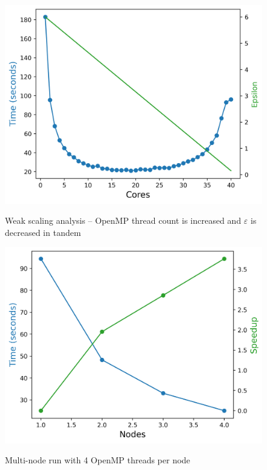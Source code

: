 \begin{figure}[h]
  \centering
  \begin{minipage}{0.45\linewidth}
  \includegraphics[width=\linewidth]{figs/omp_weak.out}
	\caption{Weak scaling analysis -- OpenMP thread count is increased and $\varepsilon$ is decreased in tandem}
    \label{fig:omp_weak}
  \end{minipage}
  \hspace{.05\linewidth}
 \begin{minipage}{0.45\linewidth}
  \includegraphics[width=\linewidth]{figs/mpi_strong_multinode.out}
  \caption{Multi-node run with 4 OpenMP threads per node}
    \label{fig:mpi_strong_multinode}
    \end{minipage}
\end{figure}

